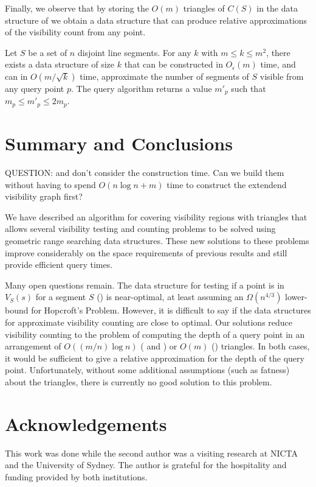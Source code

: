 \documentclass{patmorin}
\newcommand{\Oe}{O_\epsilon}
\begin{document}
Finally, we observe that by storing the $O(m)$ triangles of $C(S)$ in the
data structure of  we obtain a data structure
that can produce relative approximations of the visibility count from any
point.

\begin{thm}
Let $S$ be a set of $n$ disjoint line segments. For any $k$ with
$m\le k\le m^2$,  there exists a data structure of size $k$ that can be
constructed in $\Oe(m)$ time, and can in $O(m/\sqrt{k})$ time, approximate
the number of segments of $S$ visible from any query point $p$.  The query
algorithm returns a value $m'_p$ such that $m_p \le m'_p \le 2m_p$.
\end{thm}

\section{Summary and Conclusions}

QUESTION:  and  don't consider the
construction time.  Can we build them without having to spend $O(n\log n +
m)$ time to construct the extendend visibility graph first?

We have described an algorithm for covering visibility regions with
triangles that allows several visibility testing and counting problems
to be solved using geometric range searching data structures.  These new
solutions to these problems improve considerably on the space requirements
of previous results and still provide efficient query times.

Many open questions remain.  The data structure for testing if a point is
in $V_S(s)$ for a segment $S$ () is near-optimal,
at least assuming an $\Omega(n^{4/3})$ lower-bound for Hopcroft's
Problem.  However, it is difficult to say if the data structures for
approximate visibility counting are close to optimal.  Our solutions
reduce visibility counting to the problem of computing the depth of a
query point in an arrangement of $O((m/n)\log n)$ (
and ) or $O(m)$ () triangles.
In both cases, it would be sufficient to give a relative approximation
for the depth of the query point.  Unfortunately, without some additional
assumptions (such as fatness) about the triangles, there is currently
no good solution to this problem.

\section*{Acknowledgements}

This work was done while the second author was a visiting research at NICTA
and the University of Sydney.  The author is grateful for the hospitality
and funding provided by both institutions.



\end{document}
